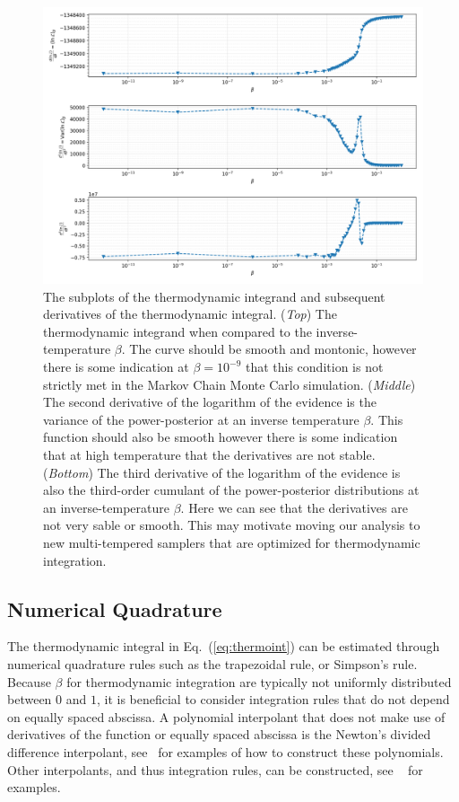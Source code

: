 \begin{figure}[th]
\centering
\includegraphics[width=1.0\textwidth]{figs/chapter6/gooseneck_plots_log.png}
\caption{The subplots of the thermodynamic integrand and subsequent derivatives of the thermodynamic integral. (\textit{Top}) The thermodynamic integrand when compared to the inverse-temperature $\beta$. The curve should be smooth and montonic, however there is some indication at $\beta = 10^{-9}$ that this condition is not strictly met in the Markov Chain Monte Carlo simulation. (\textit{Middle}) The second derivative of the logarithm of the evidence is the variance of the power-posterior at an inverse temperature $\beta$. This function should also be smooth however there is some indication that at high temperature that the derivatives are not stable. (\textit{Bottom}) The third derivative of the logarithm of the evidence is also the third-order cumulant of the power-posterior distributions at an inverse-temperature $\beta$. Here we can see that the derivatives are not very sable or smooth. This may motivate moving our analysis to new multi-tempered samplers that are optimized for thermodynamic integration.}
\label{fig:gooseneck_log}
\end{figure}

\subsection{Numerical Quadrature}
The thermodynamic integral in Eq.~(\ref{eq:thermoint}) can be estimated through numerical quadrature rules such as the trapezoidal rule, or Simpson's rule. Because $\beta$ for thermodynamic integration are typically not uniformly distributed between $0$ and $1$, it is beneficial to consider integration rules that do not depend on equally spaced abscissa. A polynomial interpolant that does not make use of derivatives of the function or equally spaced abscissa is the Newton's divided difference interpolant, see~\cite{brun1953generalization, selmer1958numerical, abramowitz1965handbook} for examples of how to construct these polynomials. Other  interpolants, and thus integration rules, can be constructed, see ~\cite{abramowitz1965handbook} for examples.

